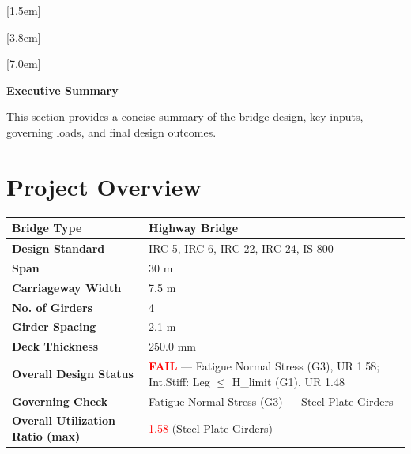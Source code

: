 \documentclass[12pt,a4paper]{report}
\numberwithin{table}{chapter}
\numberwithin{figure}{chapter}
\begin{document}
[1.5em]
  {\normalfont\vspace{2pt}}
  {\contentslabel{1.5em}}
  {\hspace*{-1.5em}}
  {\hfill\contentspage}

[3.8em]
  {\normalfont}
  {\contentslabel{2.3em}}
  {\hspace*{-2.3em}}
  {\hfill\contentspage}

[7.0em]
  {\normalfont}
  {\contentslabel{3.2em}}
  {\hspace*{-3.2em}}
  {\hfill\contentspage}

\newpage
\renewcommand{\contentsname}{\centering\Large\bfseries Table of Contents}
\tableofcontents


\newpage
{\centering\Large\bfseries Executive Summary\par}
\vspace{0.8em}

This section provides a concise summary of the bridge design, key inputs, governing loads, and final design outcomes.

\section*{Project Overview}
\label{sec:project-overview}


\begin{tabular}{|L{5.5cm}|L{8.5cm}|}
\hline
\textbf{Bridge Type} & Highway Bridge \\
\hline
\textbf{Design Standard} & IRC 5, IRC 6, IRC 22, IRC 24, IS 800 \\
\hline
\textbf{Span} & 30 m \\
\hline
\textbf{Carriageway Width} & 7.5 m \\
\hline
\textbf{No. of Girders} & 4 \\
\hline
\textbf{Girder Spacing} & 2.1 m \\
\hline
\textbf{Deck Thickness} & 250.0 mm \\
\hline
\textbf{Overall Design Status} & \textcolor{red}{\textbf{FAIL}} --- Fatigue Normal Stress (G3), UR 1.58; Int.Stiff:\allowbreak{} Leg \ensuremath{\leq} H\_\allowbreak{}limit (G1), UR 1.48 \\
\hline
\textbf{Governing Check} & Fatigue Normal Stress (G3) --- Steel Plate Girders \\
\hline
\textbf{Overall Utilization Ratio (max)} & \textcolor{red}{1.58} (Steel Plate Girders) \\
\hline
\end{tabular}
\end{document}
